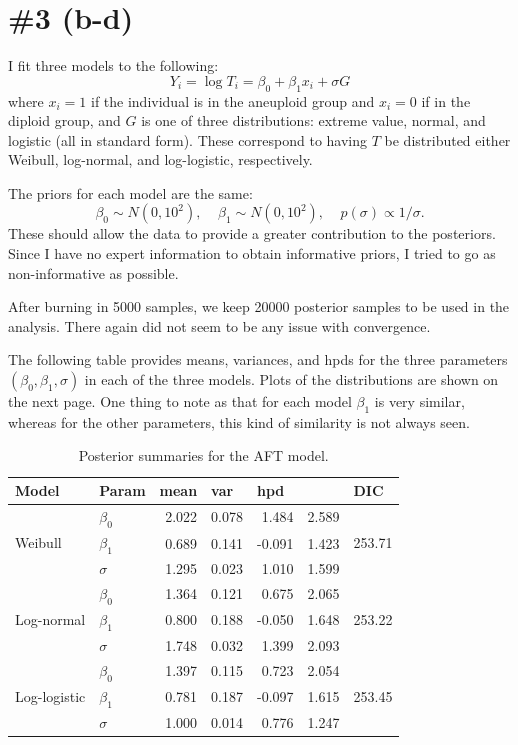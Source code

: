 \documentclass[12pt]{article}
\begin{document}
\section*{\#3 (b-d)}

\noindent I fit three models to the following:
\[ Y_i = \log T_i = \beta_0 + \beta_1 x_i + \sigma G \]
where $x_i=1$ if the individual is in the aneuploid group and $x_i=0$ if in the diploid group, and $G$ is one of three distributions: extreme value, normal, and logistic (all in standard form). These correspond to having $T$ be distributed either Weibull, log-normal, and log-logistic, respectively.
\bigskip

\noindent The priors for each model are the same:
\[ \beta_0 \sim N(0, 10^2),~~~~~ \beta_1\sim N(0, 10^2), ~~~~~ p(\sigma) \propto 1/\sigma. \]
\noindent These should allow the data to provide a greater contribution to the posteriors. Since I have no expert information to obtain informative priors, I tried to go as non-informative as possible.
\bigskip

\noindent After burning in 5000 samples, we keep 20000 posterior samples to be used in the analysis. There again did not seem to be any issue with convergence.
\bigskip

\noindent The following table provides means, variances, and hpds for the three parameters $(\beta_0, \beta_1, \sigma)$ in each of the three models. Plots of the distributions are shown on the next page. One thing to note as that for each model $\beta_1$ is very similar, whereas for the other parameters, this kind of similarity is not always seen.
\bigskip

\begin{table}[ht]
\centering
\begin{tabular}{ll|rrrrr} \hline\hline
Model & Param & \multicolumn{1}{l}{mean} & \multicolumn{1}{l}{var} &
    \multicolumn{2}{l}{hpd} & \multicolumn{1}{l}{DIC} \\ \hline
\multirow{3}{*}{Weibull}      & $\beta_0$ & 2.022 & 0.078 &  1.484 & 2.589 & \multirow{3}{*}{253.71} \\
                              & $\beta_1$ & 0.689 & 0.141 & -0.091 & 1.423 & \\
                              & $\sigma$  & 1.295 & 0.023 &  1.010 & 1.599 & \\ \hline
\multirow{3}{*}{Log-normal}   & $\beta_0$ & 1.364 & 0.121 &  0.675 & 2.065 & \multirow{3}{*}{253.22} \\
                              & $\beta_1$ & 0.800 & 0.188 & -0.050 & 1.648 & \\
                              & $\sigma$  & 1.748 & 0.032 &  1.399 & 2.093 & \\ \hline
\multirow{3}{*}{Log-logistic} & $\beta_0$ & 1.397 & 0.115 &  0.723 & 2.054 & \multirow{3}{*}{253.45} \\
                              & $\beta_1$ & 0.781 & 0.187 & -0.097 & 1.615 & \\
                              & $\sigma$  & 1.000 & 0.014 &  0.776 & 1.247 & \\ \hline\hline
\end{tabular}
\caption{Posterior summaries for the AFT model.}
\end{table}
\end{document}
